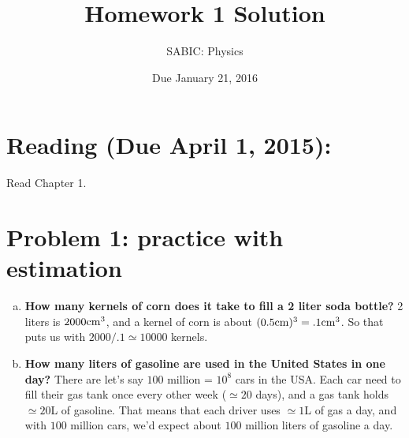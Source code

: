 \documentclass[10pt,letter]{article}
\begin{document}


\title{Homework 1 Solution}

\author{SABIC: Physics}

\date{Due January 21, 2016}
 
\maketitle 

\section*{Reading (Due April 1, 2015):}
Read Chapter 1.
\section*{Problem 1: practice with estimation}
\begin{enumerate}[(a)]
\item {\bf How many kernels of corn does it take to fill a 2 liter soda bottle?}
\hspace{2pt}
2 liters is $2000 {\rm cm}^3$, and a kernel of corn is about $(0.5{\rm cm})^3 = .1 {\rm cm}^3$. So that puts us with $2000/.1 \simeq 10000$ kernels.
\item {\bf How many liters of gasoline are used in the United States in one day?}
\hspace{2pt}
There are let's say $100$ million = $10^8$ cars in the USA. Each car need to fill their gas tank once every other week ($\simeq 20$ days), and a gas tank holds $\simeq 20$L of gasoline. That means that each driver uses $\simeq 1$L of gas a day, and with $100$ million cars, we'd expect about $100$ million liters of gasoline a day.

\end{enumerate}
\end{document}
